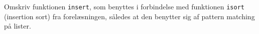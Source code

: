 Omskriv funktionen \lstinline{insert}, som benyttes i forbindelse med
  funktionen \lstinline{isort} (insertion sort) fra forelæsningen,
  således at den benytter sig af pattern matching på lister.
